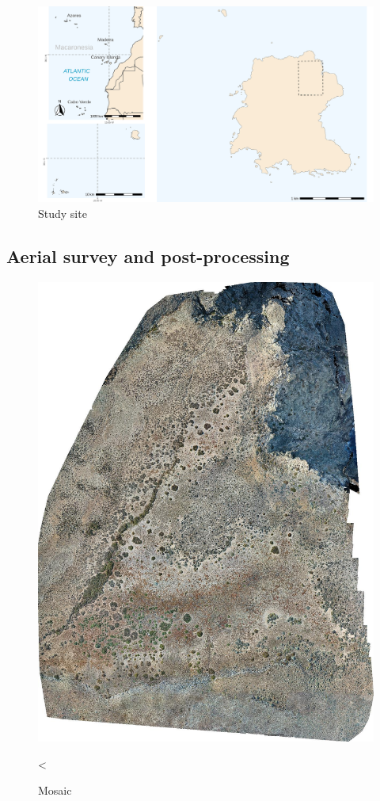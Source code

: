 \documentclass[12pt]{article}
\begin{document}
\begin{figure}[h]
	\caption{Study site}
	\centering
	\includegraphics[width=1\textwidth]{map}
\end{figure}


\subsection{Aerial survey and post-processing}

\begin{figure}[h]
	\centering
	\includegraphics[width=1\textwidth]{mosaic}
	\caption{Mosaic}<
	\label{fig:mosaic}
\end{figure}
\end{document}
